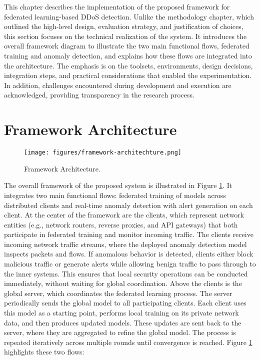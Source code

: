 This chapter describes the implementation of the proposed framework for federated learning-based DDoS detection. Unlike the methodology chapter, which outlined the high-level design, evaluation strategy, and justification of choices, this section focuses on the technical realization of the system. It introduces the overall framework diagram to illustrate the two main functional flows, federated training and anomaly detection, and explains how these flows are integrated into the architecture. The emphasis is on the toolsets, environments, design decisions, integration steps, and practical considerations that enabled the experimentation. In addition, challenges encountered during development and execution are acknowledged, providing transparency in the research process.

\section{Framework Architecture}

\begin{figure}[h]
    \centering
    \texttt{[image: figures/framework-architechture.png]}
    \caption{Framework Architecture.}
    \label{fig:framework_architecture}
\end{figure}

The overall framework of the proposed system is illustrated in Figure \ref{fig:framework_architecture}. It integrates two main functional flows: federated training of models across distributed clients and real-time anomaly detection with alert generation on each client. At the center of the framework are the clients, which represent network entities (e.g., network routers, reverse proxies, and API gateways) that both participate in federated training and monitor incoming traffic. The clients receive incoming network traffic streams, where the deployed anomaly detection model inspects packets and flows. If anomalous behavior is detected, clients either block malicious traffic or generate alerts while allowing benign traffic to pass through to the inner systems. This ensures that local security operations can be conducted immediately, without waiting for global coordination. Above the clients is the global server, which coordinates the federated learning process. The server periodically sends the global model to all participating clients. Each client uses this model as a starting point, performs local training on its private network data, and then produces updated models. These updates are sent back to the server, where they are aggregated to refine the global model. The process is repeated iteratively across multiple rounds until convergence is reached. Figure \ref{fig:framework_architecture} highlights these two flows:

